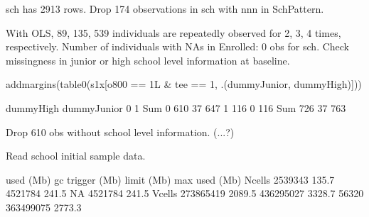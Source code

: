\textsf{sch} has 2913 rows. Drop 174 observations in \textsf{sch} with nnn in \textsf{SchPattern}. 

With OLS,  89, 135, 539 individuals are repeatedly observed for 2, 3, 4 times, respectively. %
Number of individuals with NAs in \textsf{Enrolled}: 0 obs for \textsf{sch}. 
Check missingness in junior or high school level information at baseline.
\begin{Schunk}
\begin{Sinput}
addmargins(table0(s1x[o800 == 1L & tee == 1, .(dummyJunior, dummyHigh)]))
\end{Sinput}
\begin{Soutput}
           dummyHigh
dummyJunior   0   1 Sum
        0   610  37 647
        1   116   0 116
        Sum 726  37 763
\end{Soutput}
\end{Schunk}
Drop 610 obs without school level information. (...?)

Read school initial sample data.
\begin{Schunk}
\begin{Soutput}
            used   (Mb) gc trigger   (Mb) limit (Mb)  max used   (Mb)
Ncells   2539343  135.7    4521784  241.5         NA   4521784  241.5
Vcells 273865419 2089.5  436295027 3328.7      56320 363499075 2773.3
\end{Soutput}
\end{Schunk}








